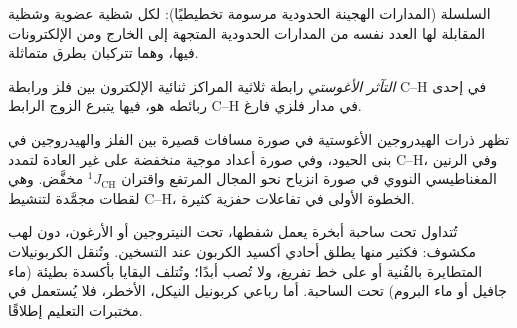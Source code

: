 \begin{omfigure}

{\small السلسلة  (المدارات الهجينة الحدودية مرسومة تخطيطيًا): لكل شظية
عضوية وشظية  المقابلة لها العدد نفسه من
المدارات الحدودية المتجهة إلى الخارج ومن الإلكترونات فيها، وهما تتركبان بطرق
متماثلة.}
\end{omfigure}

\begin{definition}\label{def:b3:organometallic-bonding:agostic}
\emph{التآثر الأغوستي} رابطة ثلاثية المراكز
ثنائية الإلكترون بين فلز ورابطة C--H في إحدى ربائطه هو، فيها
يتبرع الزوج الرابط C--H في مدار فلزي فارغ.
\end{definition}

تظهر ذرات الهيدروجين الأغوستية في صورة مسافات قصيرة بين الفلز والهيدروجين في بنى
الحيود، وفي صورة أعداد موجية منخفضة على غير العادة لتمدد C--H، وفي الرنين المغناطيسي النووي في صورة
انزياح نحو المجال المرتفع واقتران $^1J_{\mathrm{CH}}$ مخفَّض. وهي لقطات مجمَّدة
لتنشيط C--H، الخطوة الأولى في تفاعلات حفزية كثيرة.

\begin{inthelab}
تُتداول  تحت ساحبة أبخرة يعمل شفطها، تحت
النيتروجين أو الأرغون، دون لهب مكشوف: فكثير منها يطلق أحادي أكسيد الكربون عند
التسخين. وتُنقل الكربونيلات المتطايرة بالقُنية أو على خط تفريغ، ولا
تُصب أبدًا؛ وتُتلف البقايا بأكسدة بطيئة (ماء جافيل أو ماء البروم) تحت
الساحبة. أما رباعي كربونيل النيكل، الأخطر، فلا يُستعمل في مختبرات
التعليم إطلاقًا.
\end{inthelab}

